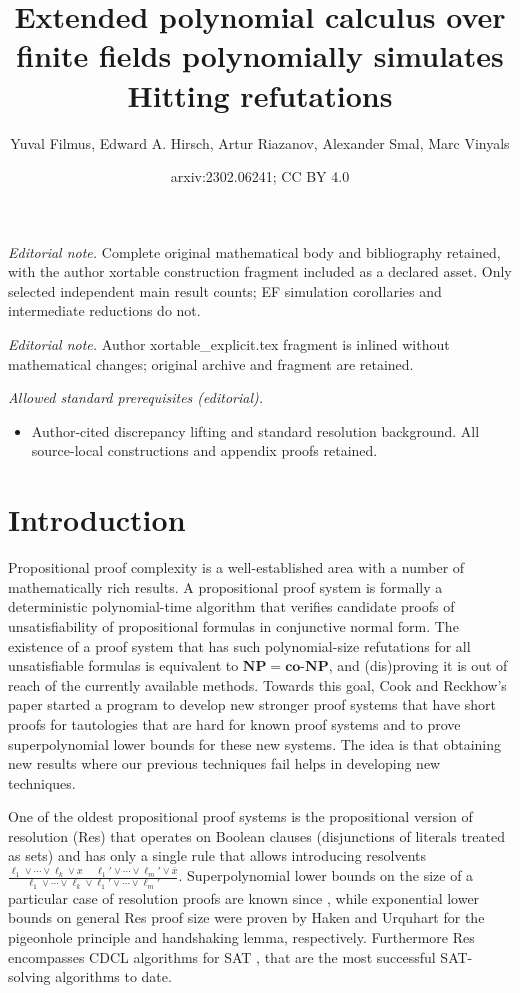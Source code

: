 \documentclass[11pt]{article}
\title{Extended polynomial calculus over finite fields polynomially simulates Hitting refutations}
\author{Yuval Filmus, Edward A. Hirsch, Artur Riazanov, Alexander Smal, Marc Vinyals}
\date{arxiv:2302.06241; CC BY 4.0}
\newcommand{\scterm}[1]{{\textrm{\sc #1}}}
\newcommand{\res}{\scterm{Res}}
\newcommand{\olnot}[1]{\overline{#1}}
\numberwithin{equation}{section}
\begin{document}
\maketitle
\noindent\textit{Editorial note.} Complete original mathematical body and bibliography retained, with the author xortable construction fragment included as a declared asset. Only selected independent main result counts; EF simulation corollaries and intermediate reductions do not.\par\medskip
\noindent\textit{Editorial note.} Author xortable\_explicit.tex fragment is inlined without mathematical changes; original archive and fragment are retained.\par\medskip
\noindent\textit{Allowed standard prerequisites (editorial).}\begin{itemize}
\item Author-cited discrepancy lifting and standard resolution background. All source-local constructions and appendix proofs retained.
\end{itemize}\medskip
\section{Introduction}
Propositional proof complexity is a well-established area with a number
of mathematically rich results. A propositional proof system \cite{CR79}
is formally a deterministic polynomial-time algorithm that verifies
candidate proofs of unsatisfiability of propositional formulas in conjunctive normal form.
The existence of a proof system that has such polynomial-size refutations for
all unsatisfiable formulas is equivalent to $\mathbf{NP}=\mathbf{co\textbf{-}NP}$,
and (dis)proving it is out of reach of the currently available methods.
Towards this goal, 
Cook and Reckhow's paper \cite{CR79}
started a program to develop new stronger proof systems 
that have short proofs for tautologies 
that are hard for known proof systems
and to prove superpolynomial lower bounds for these new systems.
The idea is that obtaining new results where our previous techniques fail helps in developing new techniques.

One of the oldest propositional proof systems is the propositional version of resolution ({\res}) \cite{Bla37, DP60}
that operates on Boolean clauses (disjunctions of literals treated as sets)
and has only a single rule that allows introducing resolvents
$\frac{\ell_1\lor\dotsb\lor\ell_k\lor x\;\quad \ell_1'\lor\dotsb\lor\ell_m'\lor\olnot{x}}{\ell_1\lor\dotsb\lor\ell_k\lor \ell_1'\lor\dotsb\lor\ell_m'}$.
Superpolynomial lower bounds on the size of a particular case of resolution proofs
are known since \cite{Tse68}, while exponential lower bounds on general {\res} proof size were proven by Haken \cite{Hak85} and Urquhart \cite{Urq87}
for the pigeonhole principle and handshaking lemma, respectively.
Furthermore {\res} encompasses CDCL algorithms for SAT \cite{BKS04,PD11}, that are the most successful SAT-solving algorithms to date.
\end{document}
